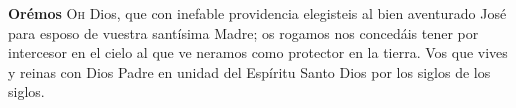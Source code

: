 \vspace{0.5em}

\textbf{Orémos}
\lettrine[lines=2]{O}h Dios, que con inefable pro­videncia elegisteis al bien­ aventurado José para esposo de vuestra santísima Madre; os ro­gamos nos concedáis tener por intercesor en el cielo al que ve­
neramos como protector en la tierra. Vos que vives y reinas con Dios Padre en unidad del Espíritu Santo Dios por los siglos de los siglos. 

\vspace{0.5em}

\begin{otherlanguage}{latin}
      

      \vspace{0.25em}

      

      \vspace{0.25em}

      

      \vspace{0.25em}

\end{otherlanguage}